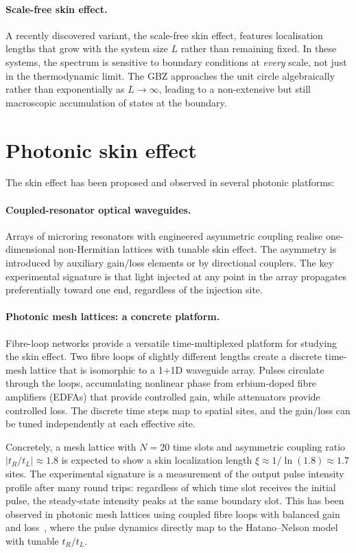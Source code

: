 \paragraph{Scale-free skin effect.}
A recently discovered variant, the scale-free skin effect, features
localisation lengths that grow with the system size $L$ rather than
remaining fixed. In these systems, the spectrum is sensitive to boundary
conditions at \emph{every} scale, not just in the thermodynamic limit.
The GBZ approaches the unit circle algebraically rather than
exponentially as $L \to \infty$, leading to a non-extensive but still
macroscopic accumulation of states at the boundary.


\section{Photonic skin effect}
\label{sec:photonic-skin}

The skin effect has been proposed and observed in several photonic
platforms:

\paragraph{Coupled-resonator optical waveguides.}
Arrays of microring resonators with engineered asymmetric coupling
realise one-dimensional non-Hermitian lattices with tunable skin
effect. The asymmetry is introduced by auxiliary gain/loss elements
or by directional couplers. The key experimental signature is that
light injected at any point in the array propagates preferentially
toward one end, regardless of the injection site.

\paragraph{Photonic mesh lattices: a concrete platform.}
Fibre-loop networks provide a versatile time-multiplexed platform for
studying the skin effect. Two fibre loops of slightly different lengths
create a discrete time-mesh lattice that is isomorphic to a 1+1D
waveguide array. Pulses circulate through the loops, accumulating
nonlinear phase from erbium-doped fibre amplifiers (EDFAs) that provide
controlled gain, while attenuators provide controlled loss. The discrete
time steps map to spatial sites, and the gain/loss can be tuned
independently at each effective site.

Concretely, a mesh lattice with $N = 20$ time slots and asymmetric
coupling ratio $|t_R/t_L| \approx 1.8$ is expected to show a skin
localization length $\xi \approx 1/\ln(1.8) \approx 1.7$ sites. The
experimental signature is a measurement of the output pulse intensity
profile after many round trips: regardless of which time slot receives
the initial pulse, the steady-state intensity peaks at the same boundary
slot. This has been observed in photonic mesh lattices using coupled
fibre loops with balanced gain and loss~\cite{wimmer2015observation},
where the pulse dynamics directly map to the Hatano--Nelson model with
tunable $t_R/t_L$.

